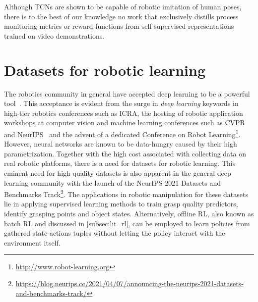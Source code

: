 \documentclass[\home/main.tex]{subfiles}
\begin{document}
Although \glspl{TCN} are shown to be capable of robotic imitation of human poses, there is to the best of our knowledge no work that exclusively distills process monitoring metrics or reward functions from self-supervised representations trained on video demonstrations. %

\section{Datasets for robotic learning} \label{sec:lit_datasets}
The robotics community in general have accepted deep learning to be a powerful tool~\autocite{Sunderhauf2018}. This acceptance is evident from the surge in \textit{deep learning} keywords in high-tier robotics conferences such as ICRA, the hosting of robotic application workshops at computer vision and machine learning conferences such as CVPR~\autocite{angelova2017computer} and NeurIPS~\autocite{Posner2017} and the advent of a dedicated Conference on Robot Learning\footnote{\url{http://www.robot-learning.org}}. However, neural networks are known to be data-hungry caused by their high parametrization. Together with the high cost associated with collecting data on real robotic platforms, there is a need for datasets for robotic learning. This eminent need for high-quality datasets is also apparent in the general deep learning community with the launch of the NeurIPS 2021 Datasets and Benchmarks Track\footnote{\url{https://blog.neurips.cc/2021/04/07/announcing-the-neurips-2021-datasets-and-benchmarks-track/}}. The applications in robotic manipulation for these datasets lie in applying supervised learning methods to train grasp quality predictors, identify grasping points and object states. Alternatively, offline RL, also known as batch RL and discussed in \cref{subsec:lit_rl}, can be employed to learn policies from gathered state-actions tuples without letting the policy interact with the environment itself.
\end{document}
